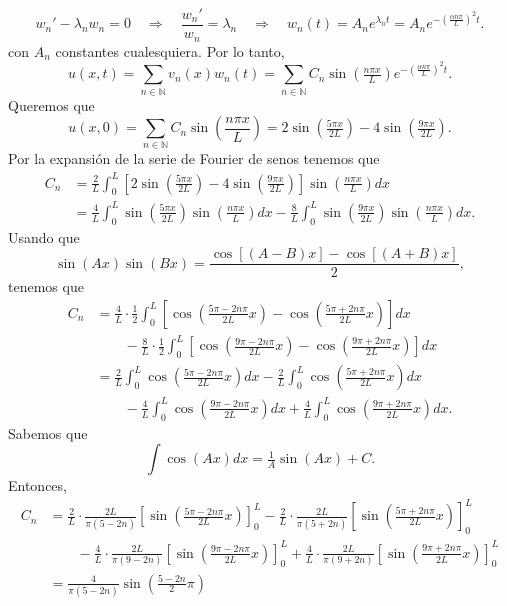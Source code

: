 \documentclass[12pt]{article}
\newcommand{\N}{\mathbb{N}}
\newcommand{\pp}[1]{\left( #1 \right)}
\newcommand{\cc}[1]{\left[ #1 \right]}
\newcommand{\Imp}{\quad\Longrightarrow\quad}
\renewcommand{\l}{\lambda}
\renewcommand{\a}{\alpha}
\begin{document}
\begin{enumerate}
\begin{enumerate}
            \[ {w_n}'-\l_n w_n=0 \Imp \frac{{w_n}'}{w_n} = \l_n \Imp w_n(t)= A_ne^{\l_nt} = A_ne^{-\pp{\frac{\a n\pi}{L}}^2t}. \]
            con $A_n$ constantes cualesquiera. Por lo tanto,
            \[ u(x,t)=\sum_{n\in\N}v_n(x)w_n(t)=\sum_{n\in\N}C_n \sin\pp{\tfrac{n\pi x}{L}}e^{-\pp{\tfrac{\a n\pi}{L}}^2t}.\]
            Queremos que
            \[ u(x,0)=\sum_{n\in\N}C_n \sin\pp{\frac{n\pi x}{L}}=2\sin\pp{\tfrac{5\pi x}{2L}}-4\sin\pp{\tfrac{9\pi x}{2L}}.\]
            Por la expansión de la serie de Fourier de senos tenemos que
            \begin{align*}
                C_n &= \frac{2}{L}\int_0^L\cc{2\sin\pp{\tfrac{5\pi x}{2L}}-4\sin\pp{\tfrac{9\pi x}{2L}}}\sin\pp{\tfrac{n\pi x}{L}}dx\\
                &= \frac{4}{L}\int_0^L\sin\pp{\tfrac{5\pi x}{2L}}\sin\pp{\tfrac{n\pi x}{L}}dx-\frac{8}{L}\int_0^L\sin\pp{\tfrac{9\pi x}{2L}}\sin\pp{\tfrac{n\pi x}{L}}dx.
            \end{align*}
            Usando que
            \[ \sin(Ax)\sin(Bx)=\frac{\cos[(A-B)x]-\cos[(A+B)x]}{2}, \]
            tenemos que
            \begin{align*}
                C_n &= \frac{4}{L}\cdot\frac{1}{2}\int_0^L\cc{\cos\pp{\tfrac{5\pi-2n\pi}{2L}x}-\cos\pp{\tfrac{5\pi+2n\pi}{2L}x}}dx\\
                &\qquad-\frac{8}{L}\cdot\frac{1}{2}\int_0^L\cc{\cos\pp{\tfrac{9\pi-2n\pi}{2L}x}-\cos\pp{\tfrac{9\pi+2n\pi}{2L}x}}dx\\
                &= \frac{2}{L}\int_0^L\cos\pp{\tfrac{5\pi-2n\pi}{2L}x}dx-\frac{2}{L}\int_0^L\cos\pp{\tfrac{5\pi+2n\pi}{2L}x}dx\\
                &\qquad-\frac{4}{L}\int_0^L\cos\pp{\tfrac{9\pi-2n\pi}{2L}x}dx+\frac{4}{L}\int_0^L\cos\pp{\tfrac{9\pi+2n\pi}{2L}x}dx.
            \end{align*}
            Sabemos que
            \[ \int\cos(Ax)dx=\tfrac{1}{A}\sin(Ax)+C. \]
            Entonces,
            \begin{align*}
                C_n &= \frac{2}{L}\cdot\frac{2L}{\pi(5-2n)}\cc{\sin\pp{\tfrac{5\pi-2n\pi}{2L}x}}_0^L
                     -\frac{2}{L}\cdot\frac{2L}{\pi(5+2n)}\cc{\sin\pp{\tfrac{5\pi+2n\pi}{2L}x}}_0^L\\
                &\qquad-\frac{4}{L}\cdot\frac{2L}{\pi(9-2n)}\cc{\sin\pp{\tfrac{9\pi-2n\pi}{2L}x}}_0^L
                +\frac{4}{L}\cdot\frac{2L}{\pi(9+2n)}\cc{\sin\pp{\tfrac{9\pi+2n\pi}{2L}x}}_0^L\\[4pt]
                &= \frac{4}{\pi(5-2n)}\sin\pp{\tfrac{5-2n}{2}\pi}

\end{align*}
\end{enumerate}
\end{enumerate}
\end{document}
